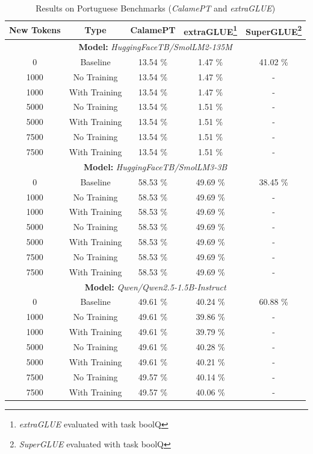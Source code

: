 \begin{table}[H]
\centering
\begin{tabular}{ccccc}
\hline
\textbf{New Tokens} & \textbf{Type} & \textbf{CalamePT} & \textbf{extraGLUE\footnote{\textit{extraGLUE} evaluated with task boolQ}} & \textbf{SuperGLUE\footnote{\textit{SuperGLUE} evaluated with task boolQ}} \\
\hline
\multicolumn{5}{c}{\textbf{Model:} \emph{HuggingFaceTB/SmolLM2-135M}} \\
 0     & Baseline      & 13.54 \% & 1.47 \% & 41.02 \% \\
 1000  & No Training   & 13.54 \% & 1.47 \% & - \\
 1000  & With Training & 13.54 \% & 1.47 \% & - \\
 5000  & No Training   & 13.54 \% & 1.51 \% & - \\
 5000  & With Training & 13.54 \% & 1.51 \% & - \\
 7500  & No Training   & 13.54 \% & 1.51 \% & - \\
 7500  & With Training & 13.54 \% & 1.51 \% & - \\
\hline
\multicolumn{5}{c}{\textbf{Model:} \emph{HuggingFaceTB/SmolLM3-3B}} \\
0     & Baseline      & 58.53 \% & 49.69 \% & 38.45 \% \\
1000  & No Training   & 58.53 \% & 49.69 \% & - \\
1000  & With Training & 58.53 \% & 49.69 \% & - \\
5000  & No Training   & 58.53 \% & 49.69 \% & - \\
5000  & With Training & 58.53 \% & 49.69 \% & - \\
7500  & No Training   & 58.53 \% & 49.69 \% & - \\
7500  & With Training & 58.53 \% & 49.69 \% & - \\
\hline
\multicolumn{5}{c}{\textbf{Model:} \emph{Qwen/Qwen2.5-1.5B-Instruct}} \\
0     & Baseline      & 49.61 \% & 40.24 \% & 60.88 \% \\
1000  & No Training   & 49.61 \% & 39.86 \% & - \\
1000  & With Training & 49.61 \% & 39.79 \% & - \\
5000  & No Training   & 49.61 \% & 40.28 \% & - \\
5000  & With Training & 49.61 \% & 40.21 \% & - \\
7500  & No Training   & 49.57 \% & 40.14 \% & - \\
7500  & With Training & 49.57 \% & 40.06 \% & - \\
\hline
\end{tabular}
\caption{Results on Portuguese Benchmarks (\emph{CalamePT} and \emph{extraGLUE})}
\label{tab:benchmark-results}
\end{table}

